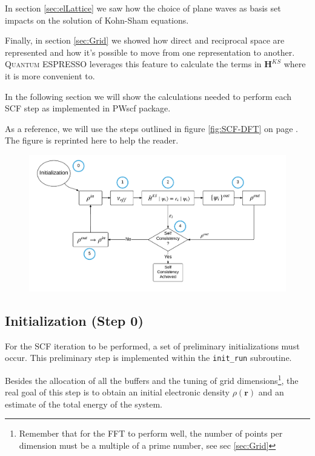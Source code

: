 \documentclass[a4paper,12pt]{article}
\newcommand\mf[1]{\mathbf{#1}}
\newcommand\dens{\rho(\mathbf{r})}
\newcommand\QE{\textsc{Quantum} ESPRESSO }
\begin{document}
In section \ref{sec:elLattice} we saw how the choice of plane waves as basis set impacts on the solution of Kohn-Sham equations.

Finally, in section \ref{sec:Grid} we showed how direct and reciprocal space are represented and how it's possible to move from one representation to another. 
\QE leverages this feature to calculate the terms in $\mf{H}^{KS}$ where it is more convenient to.


In the following section we will show the calculations needed to perform each SCF step as implemented in PWscf package.

As a reference, we will use  the steps outlined in figure \ref{fig:SCF-DFT} on page \pageref{fig:SCF-DFT}.
The figure is reprinted here to help the reader.

\begin{figure}[h]
\begin{center}
	\includegraphics[width=\linewidth]{SCF-DFT_schema.pdf}	
	\end{center}
\end{figure}

\subsection{Initialization (Step 0)}
For the SCF iteration to be performed, a set of preliminary initializations must occur.
This preliminary step is implemented within the \texttt{init\_run} subroutine.

Besides the allocation of all the buffers and the tuning of grid dimensions\footnote{Remember that for the FFT to perform well, the number of points per dimension must be a multiple of a prime number, see sec \ref{sec:Grid}}, the real goal of this step is to obtain an initial electronic density $\dens$ and an estimate of the total energy of the system.
\end{document}
